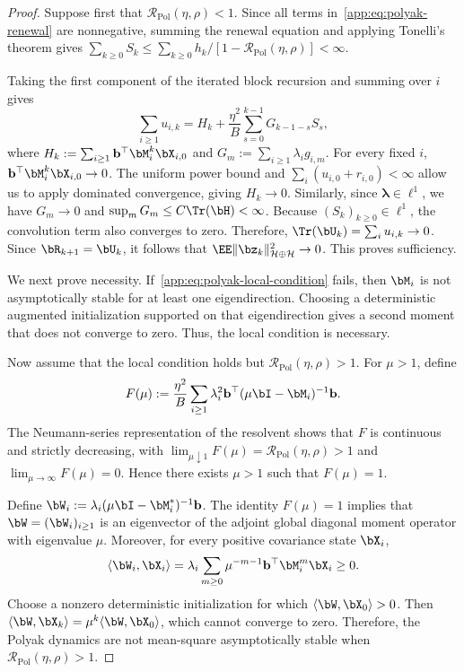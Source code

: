 \begin{proof}
Suppose first that \(\mathcal R_{\mathrm{Pol}}(\eta,\rho)<1\). Since all terms in~\eqref{app:eq:polyak-renewal} are nonnegative, summing the renewal equation and applying Tonelli's theorem gives
\(\sum_{k\geq0}S_k
\leq\sum_{k\geq0}h_k/
[1-\mathcal R_{\mathrm{Pol}}(\eta,\rho)]<\infty\).

Taking the first component of the iterated block recursion and summing over \(i\) gives
\[
\sum_{i\geq1}u_{i,k}
=
H_k
+
\frac{\eta^2}{B}
\sum_{s=0}^{k-1}G_{k-1-s}S_s,
\]
where
\(H_k:=\sum_{i\geq1}\mathbf b^\top\bM_i^k\bX_{i,0}\) and
\(G_m:=\sum_{i\geq1}\lambda_i g_{i,m}\).
For every fixed \(i\),
\(\mathbf b^\top\bM_i^k\bX_{i,0}\to0\). The uniform power bound and
\(\sum_i(u_{i,0}+r_{i,0})<\infty\) allow us to apply dominated convergence, giving \(H_k\to0\). Similarly, since
\(\bm\lambda\in\ell^1\), we have \(G_m\to0\) and
\(\sup_mG_m\leq C\Tr(\bH)<\infty\). Because
\((S_k)_{k\geq0}\in\ell^1\), the convolution term also converges to zero. Therefore,
\(\Tr(\bU_k)=\sum_i u_{i,k}\to0\). Since
\(\bR_{k+1}=\bU_k\), it follows that
\(\EE\|\bz_k\|_{\mathcal H\oplus\mathcal H}^2\to0\).
This proves sufficiency.

We next prove necessity. If~\eqref{app:eq:polyak-local-condition} fails, then \(\bM_i\) is not asymptotically stable for at least one eigendirection. Choosing a deterministic augmented initialization supported on that eigendirection gives a second moment that does not converge to zero. Thus, the local condition is necessary.

Now assume that the local condition holds but
\(\mathcal R_{\mathrm{Pol}}(\eta,\rho)>1\). For \(\mu>1\), define
\[
F(\mu)
:=
\frac{\eta^2}{B}
\sum_{i\geq1}
\lambda_i^2
\mathbf b^\top
(\mu\bI-\bM_i)^{-1}
\mathbf b.
\]
The Neumann-series representation of the resolvent shows that \(F\) is continuous and strictly decreasing, with
\(\lim_{\mu\downarrow1}F(\mu)
=\mathcal R_{\mathrm{Pol}}(\eta,\rho)>1\) and
\(\lim_{\mu\to\infty}F(\mu)=0\). Hence there exists \(\mu>1\) such that \(F(\mu)=1\).

Define
\(\bW_i:=\lambda_i(\mu\bI-\bM_i^*)^{-1}\mathbf b\).
The identity \(F(\mu)=1\) implies that
\(\bW=(\bW_i)_{i\geq1}\) is an eigenvector of the adjoint global diagonal moment operator with eigenvalue \(\mu\). Moreover, for every positive covariance state \(\bX_i\),
\[
\langle\bW_i,\bX_i\rangle
=
\lambda_i
\sum_{m\geq0}
\mu^{-m-1}
\mathbf b^\top\bM_i^m\bX_i
\geq0.
\]
Choose a nonzero deterministic initialization for which
\(\langle\bW,\bX_0\rangle>0\). Then
\(\langle\bW,\bX_k\rangle
=\mu^k\langle\bW,\bX_0\rangle\), which cannot converge to zero. Therefore, the Polyak dynamics are not mean-square asymptotically stable when
\(\mathcal R_{\mathrm{Pol}}(\eta,\rho)>1\).


\end{proof}

